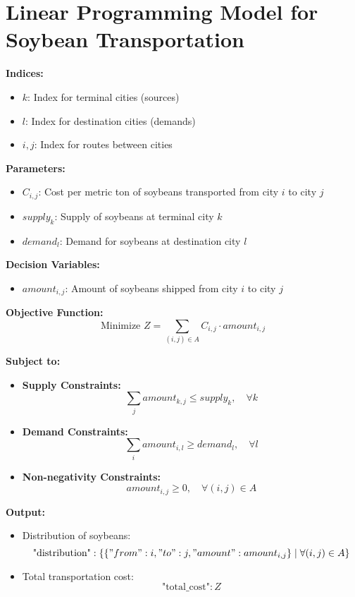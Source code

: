 \documentclass{article}
\begin{document}
\section*{Linear Programming Model for Soybean Transportation}

\textbf{Indices:}
\begin{itemize}
    \item \( k \): Index for terminal cities (sources)
    \item \( l \): Index for destination cities (demands)
    \item \( i,j \): Index for routes between cities
\end{itemize}

\textbf{Parameters:}
\begin{itemize}
    \item \( C_{i,j} \): Cost per metric ton of soybeans transported from city \( i \) to city \( j \)
    \item \( supply_{k} \): Supply of soybeans at terminal city \( k \)
    \item \( demand_{l} \): Demand for soybeans at destination city \( l \)
\end{itemize}

\textbf{Decision Variables:}
\begin{itemize}
    \item \( amount_{i,j} \): Amount of soybeans shipped from city \( i \) to city \( j \)
\end{itemize}

\textbf{Objective Function:}
\[
\text{Minimize } Z = \sum_{(i,j) \in A} C_{i,j} \cdot amount_{i,j}
\]

\textbf{Subject to:}
\begin{itemize}
    \item \textbf{Supply Constraints:} 
    \[
    \sum_{j} amount_{k,j} \leq supply_{k}, \quad \forall k
    \]
    
    \item \textbf{Demand Constraints:}
    \[
    \sum_{i} amount_{i,l} \geq demand_{l}, \quad \forall l
    \]
    
    \item \textbf{Non-negativity Constraints:}
    \[
    amount_{i,j} \geq 0, \quad \forall (i,j) \in A
    \]
\end{itemize}

\textbf{Output:}
\begin{itemize}
    \item Distribution of soybeans:
    \[
    \text{"distribution"}: \{ \{ "from": i, "to": j, "amount": amount_{i,j} \} \; | \; \forall (i,j) \in A \}
    \]
    \item Total transportation cost:
    \[
    \text{"total\_cost"}: Z
    \]
\end{itemize}
\end{document}
